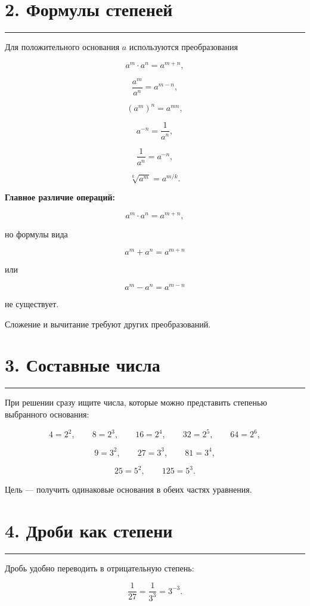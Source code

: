 \documentclass[a4paper,12pt]{article}
\newcommand{\sectionline}{\par\vspace{0.15em}\noindent\textcolor{accent}{\rule{\linewidth}{0.7pt}}\par\vspace{0.2em}}
\newcommand{\key}[1]{\textcolor{darkaccent}{\textbf{#1}}}
\begin{document}
\section*{2. Формулы степеней}
\sectionline

Для положительного основания \(a\) используются преобразования

\[
a^m\cdot a^n=a^{m+n},
\]

\[
\frac{a^m}{a^n}=a^{m-n},
\]

\[
\left(a^m\right)^n=a^{mn},
\]

\[
a^{-n}=\frac1{a^n},
\]

\[
\frac1{a^n}=a^{-n},
\]

\[
\sqrt[k]{a^m}=a^{m/k}.
\]

\key{Главное различие операций:}

\[
a^m\cdot a^n=a^{m+n},
\]

но формулы вида

\[
a^m+a^n=a^{m+n}
\]

или

\[
a^m-a^n=a^{m-n}
\]

не существует.

Сложение и вычитание требуют других преобразований.


\section*{3. Составные числа}
\sectionline

При решении сразу ищите числа, которые можно представить степенью выбранного основания:

\[
4=2^2,
\qquad
8=2^3,
\qquad
16=2^4,
\qquad
32=2^5,
\qquad
64=2^6,
\]

\[
9=3^2,
\qquad
27=3^3,
\qquad
81=3^4,
\]

\[
25=5^2,
\qquad
125=5^3.
\]

Цель --- получить одинаковые основания в обеих частях уравнения.


\section*{4. Дроби как степени}
\sectionline

Дробь удобно переводить в отрицательную степень:

\[
\frac1{27}
=
\frac1{3^3}
=
3^{-3}.
\]
\end{document}
